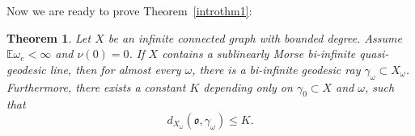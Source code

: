 \documentclass[12 pt]{amsart}
\newcommand{\EE}{\mathbb{E}}
\newcommand{\gothic}{\mathfrak}
\newcommand{\go}{{\gothic o}}
\newtheorem{theorem}{Theorem}[section]
\theoremstyle{definition}
\theoremstyle{remark}
\begin{document}

Now we are ready to prove Theorem~\ref{introthm1}:
\begin{theorem}\label{thm38}
Let $X$ be an infinite connected graph with bounded degree. Assume $\EE \omega_e < \infty$ and $\nu(0) = 0$. If $X$ contains a sublinearly Morse bi-infinite quasi-geodesic line, then for almost every $\omega$, there is a bi-infinite geodesic ray $\gamma_\omega \subset X_\omega$. Furthermore, there exists a constant $K$ depending only on $\gamma_0 \subset X$ and $\omega$, such that
\[d_{X_\omega} (\go, \gamma_\omega) \leq K. \]
\end{theorem}
\end{document}
